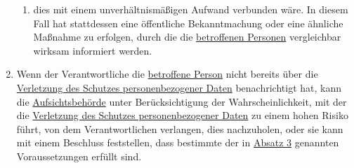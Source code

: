 \begin{enumerate}
\begin{enumerate}
    \item dies mit einem unverhältnismäßigen Aufwand verbunden wäre. In diesem Fall hat stattdessen eine öffentliche
     Bekanntmachung oder eine ähnliche Maßnahme zu erfolgen, durch die die \hyperref[itm:04-1]{betroffenen Personen} vergleichbar wirksam
     informiert werden.
    \label{itm:34-3c}

  \end{enumerate}

  \item Wenn der Verantwortliche die \hyperref[itm:04-1]{betroffene Person} nicht bereits über die \hyperref[itm:04-12]{Verletzung des Schutzes personenbezogener
   Daten} benachrichtigt hat, kann die \hyperref[itm:04-21]{Aufsichtsbehörde} unter Berücksichtigung der Wahrscheinlichkeit, mit der die
   \hyperref[itm:04-12]{Verletzung des Schutzes personenbezogener Daten} zu einem hohen Risiko führt, von dem Verantwortlichen verlangen,
   dies nachzuholen, oder sie kann mit einem Beschluss feststellen, dass bestimmte der in \hyperref[itm:34-3]{Absatz 3}
   genannten Voraussetzungen erfüllt sind.
  \label{itm:34-4}

\end{enumerate}


